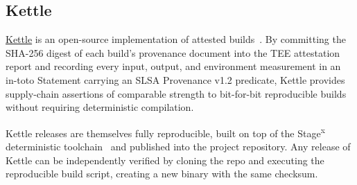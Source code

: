 \documentclass[11pt]{article}
\begin{document}
\subsection{Kettle}
\label{sec:kettle-conclusion}

\href{https://github.com/lunal-dev/kettle}{Kettle} is an open-source implementation of attested builds~\cite{ref:kettle}. By committing the SHA-256 digest of each build's provenance document into the TEE attestation report and recording every input, output, and environment measurement in an in-toto Statement carrying an SLSA Provenance v1.2 predicate, Kettle provides supply-chain assertions of comparable strength to bit-for-bit reproducible builds without requiring deterministic compilation.

Kettle releases are themselves fully reproducible, built on top of the Stage\textsuperscript{x} deterministic toolchain~\cite{ref:stagex} and published into the project repository. Any release of Kettle can be independently verified by cloning the repo and executing the reproducible build script, creating a new binary with the same checksum.

\end{document}
